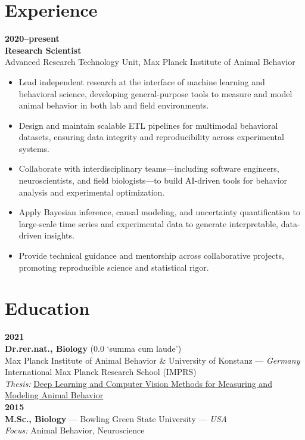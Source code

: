 \documentclass[10pt,a4paper]{article}
\begin{document}
\section*{Experience}
\textbf{2020--present}\\
\textbf{Research Scientist}\\
Advanced Research Technology Unit, Max Planck Institute of Animal Behavior
\begin{itemize}
	\item Lead independent research at the interface of machine learning and behavioral science, developing general-purpose tools to measure and model animal behavior in both lab and field environments.
	\item Design and maintain scalable ETL pipelines for multimodal behavioral datasets, ensuring data integrity and reproducibility across experimental systems.
	\item Collaborate with interdisciplinary teams—including software engineers, neuroscientists, and field biologists—to build AI-driven tools for behavior analysis and experimental optimization.
	\item Apply Bayesian inference, causal modeling, and uncertainty quantification to large-scale time series and experimental data to generate interpretable, data-driven insights.
	\item Provide technical guidance and mentorship across collaborative projects, promoting reproducible science and statistical rigor.
\end{itemize}

\section*{Education}

\textbf{2021} \\
\textbf{Dr.rer.nat., Biology} (0.0 ‘summa cum laude’) \\
Max Planck Institute of Animal Behavior \& University of Konstanz — \textit{Germany} \\
International Max Planck Research School (IMPRS) \\
\textit{Thesis:} \href{http://nbn-resolving.de/urn:nbn:de:bsz:352-2-dgcbudqch6ix8}{Deep Learning and Computer Vision Methods for Measuring and Modeling Animal Behavior} \\
\newpage
\textbf{2015} \\
\textbf{M.Sc., Biology} — Bowling Green State University — \textit{USA} \\
\textit{Focus:} Animal Behavior, Neuroscience \\
\end{document}
